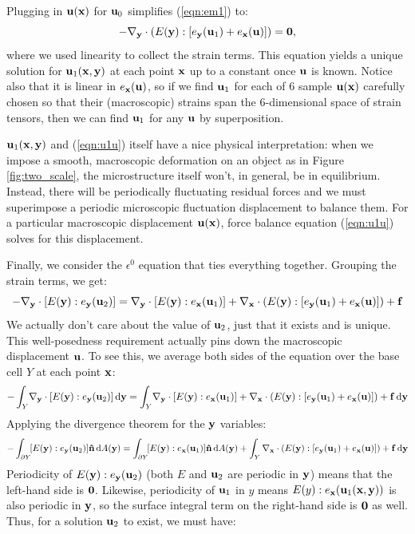\documentclass[10pt]{article}
\providecommand{\e}{\epsilon}
\begin{document}
Plugging in ${\bf u}({\bf x})$ for ${\bf u}_0$ simplifies (\ref{eqn:em1}) to:
\begin{equation}
    \label{eqn:u1u}
    -\nabla_{\bf y} \cdot (E({\bf y}) : [e_{\bf y}({\bf u}_1) + e_{\bf x}({\bf u})]) =  {\bf 0},
\end{equation}
where we used linearity to collect the strain terms. This equation yields a
unique solution for ${\bf u}_1({\bf x}, {\bf y})$ at each point ${\bf x}$ up to
a constant once ${\bf u}$ is known. Notice also that it is linear in $e_{\bf
x}({\bf u})$, so if we find ${\bf u}_1$ for each of 6 sample ${\bf u}({\bf x})$
carefully chosen so that their (macroscopic) strains span the 6-dimensional
space of strain tensors, then we can find ${\bf u}_1$ for any ${\bf u}$ by
superposition.

${\bf u}_1({\bf x}, {\bf y})$ and (\ref{eqn:u1u}) itself have a nice physical
interpretation: when we impose a smooth, macroscopic deformation on an object
as in Figure \ref{fig:two_scale}, the microstructure itself won't, in general,
be in equilibrium. Instead, there will be periodically fluctuating residual
forces and we must superimpose a periodic microscopic fluctuation displacement
to balance them. For a particular macroscopic displacement ${\bf u}({\bf x})$,
force balance equation (\ref{eqn:u1u}) solves for this displacement.

Finally, we consider the $\e^0$ equation that ties everything together.
Grouping the strain terms, we get:
$$
 -\nabla_{\bf y} \cdot [E({\bf y}) : e_{\bf y}({\bf u}_2)] = 
                     \nabla_{\bf y} \cdot [E({\bf y}) : e_{\bf x}({\bf u}_1)] +
                     \nabla_{\bf x} \cdot (E({\bf y}) : [e_{\bf y}({\bf u}_1) + e_{\bf x}({\bf u})]) + {\bf f}
$$
We actually don't care about the value of ${\bf u}_2$, just that it exists and
is unique. This well-posedness requirement actually pins down the macroscopic
displacement ${\bf u}$. To see this, we average both sides of the equation
over the base cell $Y$ at each point ${\bf x}$:
$$
-\int_Y \! \nabla_{\bf y} \cdot [E({\bf y}) : e_{\bf y}({\bf u}_2)] \, \mathrm{d}{\bf y} = 
         \int_Y \!   \nabla_{\bf y} \cdot [E({\bf y}) : e_{\bf x}({\bf u}_1)] +
         \nabla_{\bf x} \cdot (E({\bf y}) : [e_{\bf y}({\bf u}_1) + e_{\bf x}({\bf u})]) + {\bf f} \, \mathrm{d} {\bf y}
$$
Applying the divergence theorem for the ${\bf y}$ variables:
$$
-\int_{\partial Y} \! [E({\bf y}) : e_{\bf y}({\bf u}_2)] {\bf \hat{n}} \, \mathrm{d}A({\bf y}) =
 \int_{\partial Y} \! [E({\bf y}) : e_{\bf x}({\bf u}_1)] {\bf \hat{n}} \, \mathrm{d}A({\bf y}) +
         \int_Y \nabla_{\bf x} \cdot (E({\bf y}) : [e_{\bf y}({\bf u}_1) + e_{\bf x}({\bf u})]) + {\bf f} \, \mathrm{d} {\bf y}
$$
Periodicity of $E({\bf y}) : e_{\bf y}({\bf u}_2)$ (both $E$ and ${\bf
u}_2$ are periodic in ${\bf y}$) means that the left-hand side is ${\bf 0}$.
Likewise, periodicity of ${\bf u}_1$ in $y$ means $E(y) : e_{\bf x}({\bf
u}_1({\bf x}, {\bf y}))$ is also periodic in ${\bf y}$, so the surface integral
term on the right-hand side is ${\bf 0}$ as well. Thus, for a solution ${\bf
u}_2$ to exist, we must have:
\end{document}
